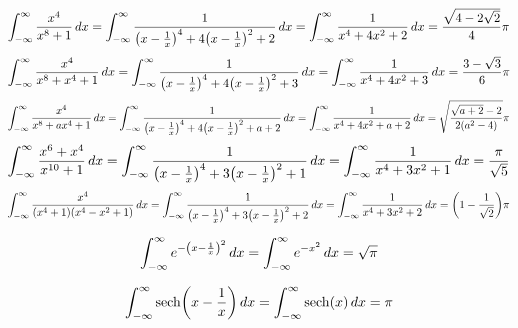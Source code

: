 \documentclass[main.tex]{subfiles}
\begin{document}
\begin{example}
    \begin{equation*}
        \int_{-\infty}^{\infty} \frac{x^4}{x^8+1}\,dx
        = \int_{-\infty}^{\infty} \frac{1}{\qty(x-\frac{1}{x})^4+4\qty(x-\frac{1}{x})^2+2}\,dx
        = \int_{-\infty}^{\infty} \frac{1}{x^4+4x^2+2}\,dx
        = \frac{\sqrt{4-2\sqrt{2}}}{4}\pi
    \end{equation*}
    \begin{equation*}
        \int_{-\infty}^{\infty} \frac{x^4}{x^8+x^4+1}\,dx
        = \int_{-\infty}^{\infty} \frac{1}{\qty(x-\frac{1}{x})^4+4\qty(x-\frac{1}{x})^2+3}\,dx
        = \int_{-\infty}^{\infty} \frac{1}{x^4+4x^2+3}\,dx
        = \frac{3-\sqrt{3}}{6}\pi
    \end{equation*}
    \begin{equation*}
        \int_{-\infty}^{\infty} \frac{x^4}{x^8+ax^4+1}\,dx
        = \int_{-\infty}^{\infty} \frac{1}{\qty(x-\frac{1}{x})^4+4\qty(x-\frac{1}{x})^2+a+2}\,dx
        = \int_{-\infty}^{\infty} \frac{1}{x^4+4x^2+a+2}\,dx
        = \sqrt{\frac{\sqrt{a+2}-2}{2(a^2-4)}}\pi
    \end{equation*}
    \begin{equation*}
        \int_{-\infty}^{\infty} \frac{x^6+x^4}{x^{10}+1}\,dx
        = \int_{-\infty}^{\infty} \frac{1}{\qty(x-\frac{1}{x})^4+3\qty(x-\frac{1}{x})^2+1}\,dx
        = \int_{-\infty}^{\infty} \frac{1}{x^4+3x^2+1}\,dx
        = \frac{\pi}{\sqrt{5}}
    \end{equation*}
    \begin{equation*}
        \int_{-\infty}^{\infty} \frac{x^4}{(x^4+1)(x^4-x^2+1)}\,dx
        = \int_{-\infty}^{\infty} \frac{1}{\qty(x-\frac{1}{x})^4+3\qty(x-\frac{1}{x})^2+2}\,dx
        = \int_{-\infty}^{\infty} \frac{1}{x^4+3x^2+2}\,dx
        = \qty(1-\frac{1}{\sqrt{2}})\pi
    \end{equation*}
\end{example}

\begin{example}
    \begin{equation*}
        \int_{-\infty}^{\infty} e^{-\qty(x-\frac{1}{x})^2}\,dx
        = \int_{-\infty}^{\infty} e^{-x^2}\,dx
        = \sqrt{\pi}
    \end{equation*}
\end{example}
\begin{example}
    \begin{equation*}
        \int_{-\infty}^{\infty} \sech(x-\frac{1}{x})\dx
        = \int_{-\infty}^{\infty} \sech(x)\dx
        = \pi
    \end{equation*}
\end{example}
\end{document}

